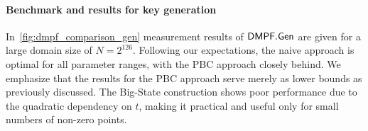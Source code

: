 \paragraph{Benchmark and results for key generation}
In~\cref{fig:dmpf_comparison_gen} measurement results of ${\sf DMPF.Gen}$ are given for a large domain size of $N=2^{126}$.
Following our expectations, the naive approach is optimal for all parameter ranges, with the PBC approach closely behind. We emphasize that the results for the PBC approach serve merely as lower bounds as previously discussed. The Big-State construction shows poor performance due to the quadratic dependency on $t$, making it practical and useful only for small numbers of non-zero points.

 

\paragraph{}

